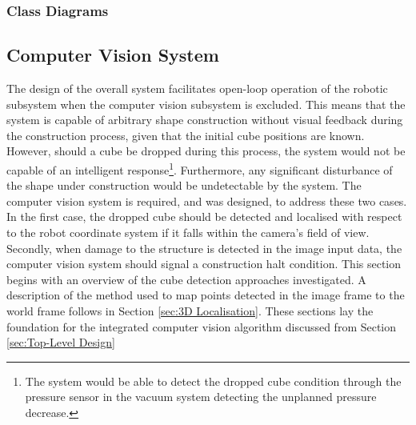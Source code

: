 
\subsubsection{Class Diagrams}

\subsection{Computer Vision System}

The design of the overall system facilitates open-loop operation of the robotic subsystem when the computer vision subsystem is excluded. This means that the system is capable of arbitrary shape construction without visual feedback during the construction process, given that the initial cube positions are known. However, should a cube be dropped during this process, the system would not be capable of an intelligent response\footnote{The system would be able to detect the dropped cube condition through the pressure sensor in the vacuum system detecting the unplanned pressure decrease.}. Furthermore, any significant disturbance of the shape under construction would be undetectable by the system. The computer vision system is required, and was designed, to address these two cases. In the first case, the dropped cube should be detected and localised with respect to the robot coordinate system if it falls within the camera's field of view. Secondly, when damage to the structure is detected in the image input data, the computer vision system should signal a construction halt condition. This section begins with an overview of the cube detection approaches investigated. A description of the method used to map points detected in the image frame to the world frame follows in Section \ref{sec:3D Localisation}. These sections lay the foundation for the integrated computer vision algorithm discussed from Section \ref{sec:Top-Level Design}

